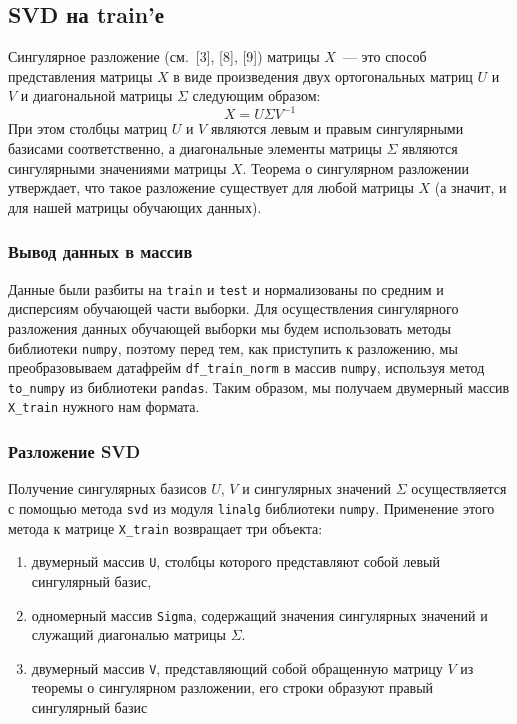 \documentclass[a4paper,12pt]{article}
\begin{document}
\subsection{SVD на train'е}


Сингулярное разложение (см. [3], [8], [9]) матрицы $X$ — это способ представления матрицы $X$ в виде произведения двух ортогональных матриц $U$ и $V$ и диагональной матрицы $\Sigma$ следующим образом: 
$$
X = U\Sigma V^{-1}
$$
При этом столбцы матриц $U$ и $V$ являются левым и правым сингулярными базисами соответственно, а диагональные элементы матрицы $\Sigma$ являются сингулярными значениями матрицы $X$. Теорема о сингулярном разложении утверждает, что такое разложение существует для любой матрицы $X$ (а значит,  и для нашей матрицы обучающих данных).

\subsubsection{Вывод данных в массив} 

Данные были разбиты на \texttt{train} и \texttt{test} и нормализованы по средним и дисперсиям  обучающей части выборки. Для осуществления сингулярного разложения данных обучающей выборки мы будем использовать методы библиотеки \texttt{numpy}, поэтому перед тем, как приступить к разложению, мы преобразовываем датафрейм \texttt{df\_train\_norm} в массив \texttt{numpy}, используя метод \texttt{to\_numpy} из библиотеки \texttt{pandas}. Таким образом, мы получаем двумерный массив \texttt{X\_train} нужного нам формата.

\subsubsection{Разложение SVD} 

Получение сингулярных базисов $U$, $V$ и сингулярных значений $\Sigma$ осуществляется с помощью метода \texttt{svd} из модуля \texttt{linalg} библиотеки \texttt{numpy}. Применение этого метода к матрице \texttt{X\_train} возвращает три объекта:

\medskip\noindent
\begin{enumerate}
	\item двумерный массив \texttt{U}, столбцы которого представляют собой левый сингулярный базис,
	\item одномерный массив \texttt{Sigma}, содержащий значения сингулярных значений и служащий диагональю матрицы $\Sigma$.
	\item двумерный массив \texttt{V}, представляющий собой обращенную матрицу $V$ из теоремы о сингулярном разложении, его строки образуют правый сингулярный базис
\end{enumerate}
\end{document}
